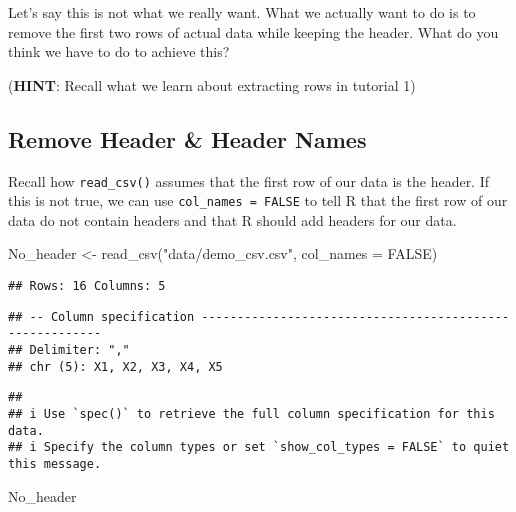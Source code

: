 \documentclass[
]{book}
\newenvironment{Shaded}{\begin{snugshade}}{\end{snugshade}}
\newcommand{\AttributeTok}[1]{\textcolor[rgb]{0.77,0.63,0.00}{#1}}
\newcommand{\ConstantTok}[1]{\textcolor[rgb]{0.00,0.00,0.00}{#1}}
\newcommand{\FunctionTok}[1]{\textcolor[rgb]{0.00,0.00,0.00}{#1}}
\newcommand{\NormalTok}[1]{#1}
\newcommand{\OtherTok}[1]{\textcolor[rgb]{0.56,0.35,0.01}{#1}}
\newcommand{\StringTok}[1]{\textcolor[rgb]{0.31,0.60,0.02}{#1}}
\begin{document}
Let's say this is not what we really want. What we actually want to do is to remove the first two rows of actual data while keeping the header. What do you think we have to do to achieve this?

(\textbf{HINT}: Recall what we learn about extracting rows in tutorial 1)

\hypertarget{remove-header-header-names}{%
\subsection{Remove Header \& Header Names}\label{remove-header-header-names}}

Recall how \texttt{read\_csv()} assumes that the first row of our data is the header. If this is not true, we can use \texttt{col\_names\ =\ FALSE} to tell R that the first row of our data do not contain headers and that R should add headers for our data.

\begin{Shaded}
\begin{Highlighting}[]
\NormalTok{No\_header }\OtherTok{\textless{}{-}} \FunctionTok{read\_csv}\NormalTok{(}\StringTok{"data/demo\_csv.csv"}\NormalTok{, }
                      \AttributeTok{col\_names =} \ConstantTok{FALSE}\NormalTok{)}
\end{Highlighting}
\end{Shaded}

\begin{verbatim}
## Rows: 16 Columns: 5
\end{verbatim}

\begin{verbatim}
## -- Column specification --------------------------------------------------------
## Delimiter: ","
## chr (5): X1, X2, X3, X4, X5
\end{verbatim}

\begin{verbatim}
##
## i Use `spec()` to retrieve the full column specification for this data.
## i Specify the column types or set `show_col_types = FALSE` to quiet this message.
\end{verbatim}

\begin{Shaded}
\begin{Highlighting}[]
\NormalTok{No\_header}
\end{Highlighting}
\end{Shaded}
\end{document}
